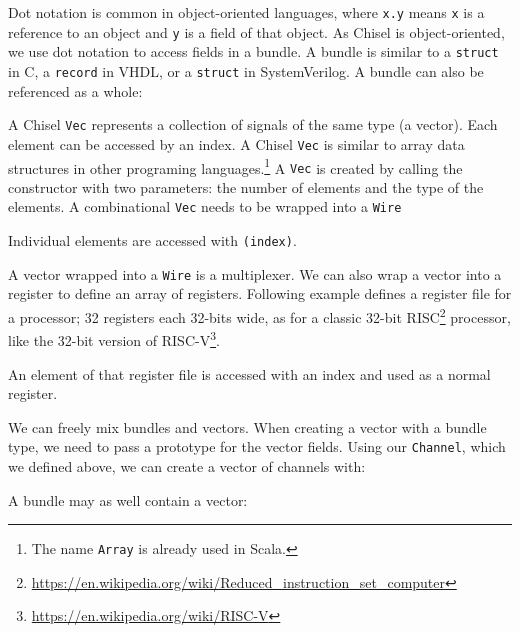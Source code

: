\documentclass[%
    10pt,
    headinclude, footexclude,
    openright, %
    notitlepage,
    cleardoubleempty,
    headsepline,
    pointlessnumbers,
    bibtotoc, idxtotoc,
    ]{scrbook}
\newcommand{\code}[1]{{\small{\texttt{#1}}}}
\newcommand{\codefoot}[1]{{\footnotesize{\texttt{#1}}}}
\newcommand{\myref}[2]{\href{#1}{#2}}
\renewcommand{\myref}[2]{{#2}{\footnote{\url{#1}}}}
\begin{document}

Dot notation is common in object-oriented languages, where \code{x.y} means
\code{x} is a reference to an object and \code{y} is a field of that object.
As Chisel is object-oriented, we use dot notation to access fields in a bundle.
A bundle is similar to a \code{struct} in C, a \code{record} in VHDL, or a
\code{struct} in SystemVerilog.
A bundle can also be referenced as a whole:




A Chisel \code{Vec} represents a collection of signals of the same type (a vector).
Each element can be accessed by an index. A Chisel \code{Vec} is similar
to array data structures in other programing languages.\footnote{The name \codefoot{Array}
is already used in Scala.}
A \code{Vec} is created by calling the constructor with two parameters: the
number of elements and the type of the elements. A combinational \code{Vec}
needs to be wrapped into a \code{Wire}


\noindent Individual elements are accessed with \code{(index)}.


A vector wrapped into a \code{Wire} is a multiplexer.
We can also wrap a vector into a register to define an array of registers.
Following example defines a register file for a processor; 32 registers
each 32-bits wide, as for a classic 32-bit 
\myref{https://en.wikipedia.org/wiki/Reduced_instruction_set_computer}{RISC}
processor, like the 32-bit version of \myref{https://en.wikipedia.org/wiki/RISC-V}{RISC-V}.


\noindent An element of that register file is accessed with an index and used as a normal register.


We can freely mix bundles and vectors. When creating a vector with a bundle
type, we need to pass a prototype for the vector fields. Using our
\code{Channel}, which we defined above, we can create a vector of channels with:


\noindent A bundle may as well contain a vector:

\end{document}
